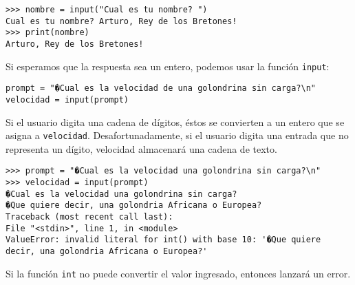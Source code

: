 
\begin{lstlisting}
>>> nombre = input("Cual es tu nombre? ")
Cual es tu nombre? Arturo, Rey de los Bretones!
>>> print(nombre)
Arturo, Rey de los Bretones!
\end{lstlisting}

Si esperamos que la respuesta sea un entero, podemos usar la función
\texttt{input}:

\begin{lstlisting}
prompt = "�Cual es la velocidad de una golondrina sin carga?\n"
velocidad = input(prompt)
\end{lstlisting}
 Si el usuario digita una cadena de dígitos, éstos se convierten a
un entero que se asigna a \texttt{velocidad}. Desafortunadamente,
si el usuario digita una entrada que no representa un dígito, velocidad
almacenará una cadena de texto.

\begin{lstlisting}
>>> prompt = "�Cual es la velocidad una golondrina sin carga?\n"
>>> velocidad = input(prompt)
�Cual es la velocidad una golondrina sin carga?
�Que quiere decir, una golondria Africana o Europea?
Traceback (most recent call last):
File "<stdin>", line 1, in <module>
ValueError: invalid literal for int() with base 10: '�Que quiere decir, una golondria Africana o Europea?'
\end{lstlisting}


Si la función \texttt{int} no puede convertir el valor ingresado, entonces lanzará un error.

